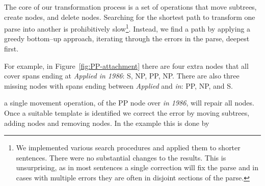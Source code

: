 The core of our transformation process is a set of operations that move
subtrees, create nodes, and delete nodes.  Searching for the shortest path to
transform one parse into another is prohibitively slow\footnote{We implemented
various search procedures and applied them to shorter sentences. There were no substantial changes to the results. This is unsurprising, as in most sentences a single correction will fix the parse and in cases with multiple errors they are often in disjoint sections of the parse.}.
Instead, we find a path by applying a greedy bottom--up approach, iterating through the errors in the parse, deepest first.

For example, in Figure~\ref{fig:PP-attachment} there are four extra
nodes that all cover spans ending at \emph{Applied in 1986}: S, NP, PP, NP.
There are also three missing nodes with spans ending between \emph{Applied} and
\emph{in}: PP, NP, and S.


a single movement operation, of the PP node over \emph{in 1986}, will repair all nodes.
Once a suitable template is identified we correct the error by moving subtrees,
adding nodes and removing nodes.  In the example this is done by 

